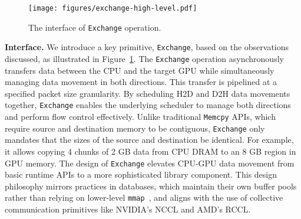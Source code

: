\begin{comment}
\begin{enumerate}[leftmargin=*]
    \item \textit{Only submit requests that will be immediately executed by GPU.}
    Thus, no tasks wait inside all levels of queues, and we can get rid of the hard-to-predict head-of-line blocking.
    However, any higher-level library can perform queuing that does not cause blocking internally.

    \item \textit{Take all concurrent data transfers into account and perform flow control accordingly.}
    Due to the irregularity of IO bandwidth, a holistic flow control mechanism that takes care of traffic in both directions is necessary to achieve overall load balance.
\end{enumerate}
\end{comment}


\begin{figure}[t]
    \centering
    \texttt{[image: figures/exchange-high-level.pdf]}
    \caption{The interface of \texttt{Exchange} operation.}
    \label{fig:io-primitive-interface}
\end{figure}

\noindent
\textbf{Interface.}
We introduce a key primitive, \texttt{Exchange}, based on the observations discussed, as illustrated in Figure~\ref{fig:io-primitive-interface}. 
The \texttt{Exchange} operation asynchronously transfers data between the CPU and the target GPU while simultaneously managing data movement in both directions. 
This transfer is pipelined at a specified packet size granularity. 
By scheduling H2D and D2H data movements together, \texttt{Exchange} enables the underlying scheduler to manage both directions and perform flow control effectively.
Unlike traditional \texttt{Memcpy} APIs, which require source and 
destination memory to be contiguous, \texttt{Exchange} only mandates that the sizes of the source and destination be identical. 
For example, it allows copying 4 chunks of 2 GB data from CPU DRAM to an 8 GB region in GPU memory.
The design of \texttt{Exchange} elevates CPU-GPU data movement from basic runtime APIs to a more sophisticated library component. 
This design philosophy mirrors practices in databases, which maintain their own buffer pools rather than relying on lower-level \texttt{mmap}~\cite{crotty2022you}, and aligns with the use of collective communication primitives like NVIDIA’s NCCL and AMD’s RCCL.

